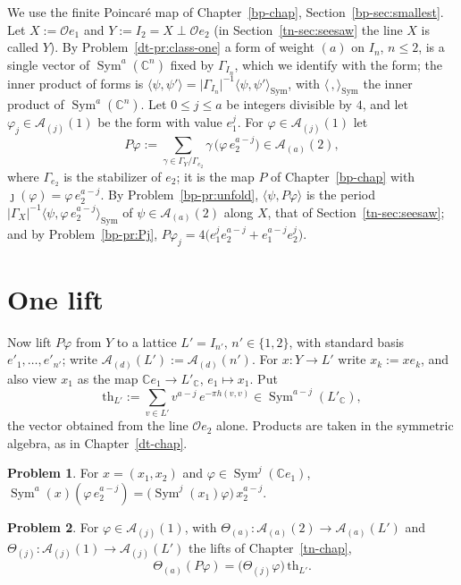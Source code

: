 \documentclass[reqno]{amsart}
\newcounter{chap}
\theoremstyle{definition}
\newtheorem{problem}{Problem}[section]
\theoremstyle{plain}
\newcommand{\C}{\mathbb{C}}
\newcommand{\Oc}{\mathcal{O}}
\newcommand{\Ac}{\mathcal{A}}
\newcommand{\Sym}{\operatorname{Sym}}
\begin{document}
We use the finite Poincar\'e map of Chapter~\ref{bp-chap}, Section~\ref{bp-sec:smallest}.  Let \(X := \Oc e_1\) and \(Y := I_2 = X \perp \Oc e_2\) (in Section~\ref{tn-sec:seesaw} the line \(X\) is called \(Y\)).  By Problem~\ref{dt-pr:class-one} a form of weight \((a)\) on \(I_n\), \(n \le 2\), is a single vector of \(\Sym^a(\C^n)\) fixed by \(\Gamma_{I_n}\), which we identify with the form; the inner product of forms is \(\langle\psi,\psi'\rangle = \lvert\Gamma_{I_n}\rvert^{-1}\langle\psi,\psi'\rangle_{\Sym}\), with \(\langle\,,\rangle_{\Sym}\) the inner product of \(\Sym^a(\C^n)\).  Let \(0 \le j \le a\) be integers divisible by \(4\), and let \(\varphi_j \in \Ac_{(j)}(1)\) be the form with value \(e_1^j\).  For \(\varphi \in \Ac_{(j)}(1)\) let
\[
  P\varphi := \sum_{\gamma \in \Gamma_Y / \Gamma_{e_2}} \gamma\,\bigl(\varphi\, e_2^{a-j}\bigr) \in \Ac_{(a)}(2) ,
\]
where \(\Gamma_{e_2}\) is the stabilizer of \(e_2\); it is the map \(P\) of Chapter~\ref{bp-chap} with \(\jmath(\varphi) = \varphi\,e_2^{a-j}\).  By Problem~\ref{bp-pr:unfold}, \(\langle\psi, P\varphi\rangle\) is the period \(\lvert\Gamma_X\rvert^{-1}\langle\psi, \varphi\,e_2^{a-j}\rangle_{\Sym}\) of \(\psi \in \Ac_{(a)}(2)\) along \(X\), that of Section~\ref{tn-sec:seesaw}; and by Problem~\ref{bp-pr:Pj}, \(P\varphi_j = 4\bigl(e_1^j e_2^{a-j} + e_1^{a-j} e_2^{j}\bigr)\).


\section{One lift}\label{sec:step}

Now lift \(P\varphi\) from \(Y\) to a lattice \(L' = I_{n'}\), \(n' \in \{1,2\}\), with standard basis \(e'_1, \dots, e'_{n'}\); write \(\Ac_{(d)}(L') := \Ac_{(d)}(n')\).  For \(x \colon Y \to L'\) write \(x_k := x e_k\), and also view \(x_1\) as the map \(\C e_1 \to L'_{\C}\), \(e_1 \mapsto x_1\).  Put
\[
  \mathrm{th}_{L'} := \sum_{v \in L'} v^{a-j}\, e^{-\pi h(v,v)} \in \Sym^{a-j}(L'_{\C}) ,
\]
the vector obtained from the line \(\Oc e_2\) alone.  Products are taken in the symmetric algebra, as in Chapter~\ref{dt-chap}.

\begin{problem}\label{pr:split}
For \(x = (x_1, x_2)\) and \(\varphi \in \Sym^j(\C e_1)\), \(\Sym^a(x)(\varphi\, e_2^{a-j}) = \bigl(\Sym^j(x_1)\varphi\bigr)\, x_2^{a-j}\).
\end{problem}

\begin{problem}\label{pr:one-step}
For \(\varphi \in \Ac_{(j)}(1)\), with \(\Theta_{(a)} \colon \Ac_{(a)}(2) \to \Ac_{(a)}(L')\) and \(\Theta_{(j)} \colon \Ac_{(j)}(1) \to \Ac_{(j)}(L')\) the lifts of Chapter~\ref{tn-chap},
\[
  \Theta_{(a)}(P\varphi) = \bigl(\Theta_{(j)}\varphi\bigr)\, \mathrm{th}_{L'} .
\]
\end{problem}
\end{document}
